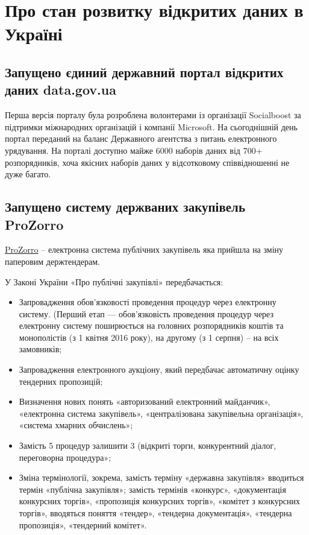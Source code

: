 \chapter{Про стан розвитку відкритих даних в Україні}

\section{Запущено єдиний державний портал відкритих даних data.gov.ua}

Перша версія порталу була розроблена волонтерами із організації Socialboost за підтримки міжнародних організацій і компанії Microsoft. На сьогоднішній день портал переданий на баланс Державного агентства з питань електронного урядування. На порталі доступно майже 6000 наборів даних від 700+ розпорядників, хоча якісних наборів даних у відсотковому співвідношенні не дуже багато.

\section{Запущено систему держваних закупівель ProZorro}

\href{https://prozorro.gov.ua}{ProZorro} – електронна система публічних закупівель яка прийшла на зміну паперовим держтендерам.

У Законі України «Про публічні закупівлі» передбачається:

\begin{itemize}
    \item Запровадження обов'язковості проведення процедур через електронну систему. (Перший етап — обов'язковість проведення процедур через електронну систему поширюється на головних розпорядників коштів та монополістів (з 1 квітня 2016 року), на другому (з 1 серпня) – на всіх замовників;
    \item Запровадження електронного аукціону, який передбачає автоматичну оцінку тендерних пропозицій;
    \item Визначення нових понять «авторизований електронний майданчик», «електронна система закупівель», «централізована закупівельна організація», «система хмарних обчислень»;
    \item Замість 5 процедур залишити 3 (відкриті торги, конкурентний діалог, переговорна процедура»;
    \item Зміна термінології, зокрема, замість терміну «державна закупівля» вводиться термін «публічна закупівля»; замість термінів «конкурс», «документація конкурсних торгів», «пропозиція конкурсних торгів», «комітет з конкурсних торгів», вводяться поняття «тендер», «тендерна документація», «тендерна пропозиція», «тендерний комітет».
\end{itemize}

